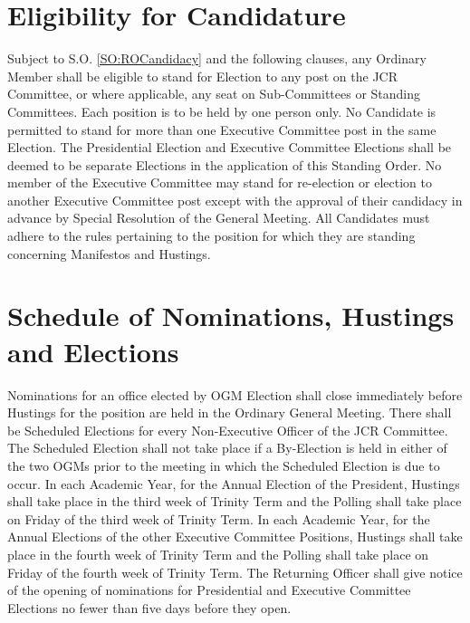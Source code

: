 \section{Eligibility for Candidature} \label{sec:CandidatureEligibility}
\npara Subject to S.O. \ref{SO:ROCandidacy} and the following clauses, any Ordinary Member shall be eligible to stand for Election to any post on the JCR Committee, or where applicable, any seat on Sub-Committees or Standing Committees.
% 
\npara Each position is to be held by one person only.
\npara No Candidate is permitted to stand for more than one Executive Committee post in the same Election.  The Presidential Election and Executive Committee Elections shall be deemed to be separate Elections in the application of this Standing Order.
\npara No member of the Executive Committee may stand for re-election or election to another Executive Committee post except with the approval of their candidacy in advance by Special Resolution of the General Meeting.
\npara All Candidates must adhere to the rules pertaining to the position for which they are standing concerning Manifestos and Hustings.
\section{Schedule of Nominations, Hustings and Elections}
\npara Nominations for an office elected by OGM Election shall close immediately before Hustings for the position are held in the Ordinary General Meeting.
\npara There shall be Scheduled Elections for every Non-Executive Officer of the JCR Committee. 
\npara The Scheduled Election shall not take place if a By-Election is held in either of the two OGMs prior to the meeting in which the Scheduled Election is due to occur.
\npara In each Academic Year, for the Annual Election of the President, Hustings shall take place in the third week of Trinity Term and the Polling shall take place on Friday of the third week of Trinity Term.
\npara In each Academic Year,  for the Annual Elections of the other Executive Committee Positions, Hustings shall take place in the fourth week of Trinity Term and the Polling shall take place on Friday of the fourth week of Trinity Term. 
\npara The Returning Officer shall give notice of the opening of nominations for Presidential and Executive Committee Elections no fewer than five days before they open.
